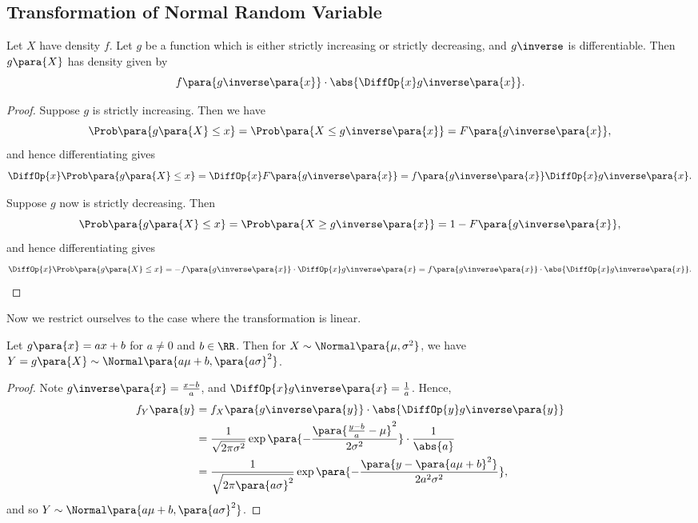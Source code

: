 \subsection{Transformation of Normal Random Variable}

\begin{theorem}
    \label{thm:transformation-of-random-variable}
    Let \(X\) have density \(f\). Let \(g\) be a function which is either strictly increasing or strictly decreasing, and \(g\inverse\) is differentiable. Then \(g\para{X}\) has density given by
    \[
        f\para{g\inverse\para{x}} \cdot \abs{\DiffOp{x} g\inverse\para{x}}.
    \]
\end{theorem}

\begin{proof}
    Suppose \(g\) is strictly increasing. Then we have
    \[
        \Prob\para{g\para{X} \leq x} = \Prob\para{X \leq g\inverse\para{x}} = F\para{g\inverse\para{x}},
    \]
    and hence differentiating gives
    \[
        \DiffOp{x} \Prob\para{g \para{X} \leq x} = \DiffOp{x} F\para{g\inverse\para{x}} = f\para{g\inverse\para{x}} \DiffOp{x} g\inverse\para{x}.
    \]

    Suppose \(g\) now is strictly decreasing. Then
    \[
        \Prob\para{g\para{X} \leq x} = \Prob\para{X \geq g\inverse\para{x}} = 1 - F\para{g\inverse\para{x}},
    \]
    and hence differentiating gives
    \[
        \DiffOp{x} \Prob\para{g\para{X} \leq x} = - f\para{g\inverse\para{x}} \cdot \DiffOp{x} g\inverse\para{x} = f\para{g\inverse\para{x}} \cdot \abs{\DiffOp{x} g\inverse\para{x}}.
    \]
\end{proof}

Now we restrict ourselves to the case where the transformation is linear.

\begin{proposition}
    \label{prop:lin-transformatino-normal}%
    Let \(g\para{x} = ax + b\) for \(a \neq 0\) and \(b \in \RR\). Then for \(X \sim \Normal\para{\mu, \sigma^2}\), we have \(Y = g\para{X} \sim \Normal\para{a \mu + b, \para{a \sigma}^2}\).
\end{proposition}

\begin{proof}
    Note \(g\inverse\para{x} = \frac{x - b}{a}\), and \(\DiffOp{x} g\inverse\para{x} = \frac{1}{a}\). Hence,
    \begin{align*}
        f_Y\para{y} &= f_X\para{g\inverse\para{y}} \cdot \abs{\DiffOp{y} g\inverse\para{y}} \\
        &= \frac{1}{\sqrt{2 \pi \sigma^2}} \exp\para{- \frac{\para{\frac{y - b}{a} - \mu}^2}{2 \sigma^2}} \cdot \frac{1}{\abs{a}} \\
        &= \frac{1}{\sqrt{2 \pi \para{a \sigma}^2}} \exp\para{- \frac{\para{y - \para{a\mu + b}^2}}{2 a^2 \sigma^2}},
    \end{align*}
    and so \(Y \sim \Normal\para{a \mu + b, \para{a \sigma}^2}\).
\end{proof}

